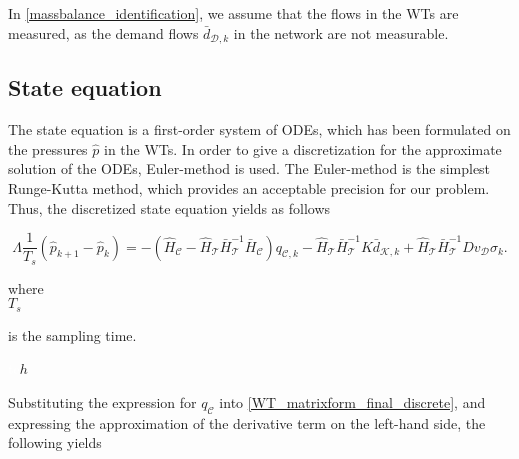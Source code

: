  In \eqref{massbalance_identification}, we assume that the flows in the WTs are measured, as the demand flows $\bar{d}_{\mathcal{D},k} $ in the network are not measurable. 


 \subsection{State equation}
\label{state_eq_identification} 

The state equation is a first-order system of ODEs, which has been formulated on the pressures $\hat{p}$ in the WTs. In order to give a discretization for the approximate solution of the ODEs, Euler-method is used. The Euler-method is the simplest Runge-Kutta method, which provides an acceptable precision for our problem\cite{chicone2006ordinary}. Thus, the discretized state equation yields as follows

\begin{equation}
  \label{WT_matrixform_final_discrete}
\Lambda \frac{1}{T_s} (\hat{p}_{k+1} - \hat{p}_k)  = - (\hat{H}_{\mathcal{C}} - \hat{H}_{\mathcal{T}} \bar{H}^{-1}_{\mathcal{T}}\bar{H}_{\mathcal{C}})  q_{\mathcal{C},k} - \hat{H}_{\mathcal{T}} \bar{H}^{-1}_{\mathcal{T}} K \bar{d}_{\mathcal{K},k} + \hat{H}_{\mathcal{T}} \bar{H}^{-1}_{\mathcal{T}} D v_{\mathcal{D}} \sigma_k.
\end{equation}

\begin{minipage}[t]{0.20\textwidth}
where\\
\hspace*{8mm} $T_s$
\end{minipage}
\begin{minipage}[t]{0.68\textwidth}
\vspace*{2mm}
 is the sampling time.
\end{minipage}
\begin{minipage}[t]{0.10\textwidth}
\vspace*{2mm}
\textcolor{White}{te}$\unit{h}$
\end{minipage} 

Substituting the expression for $q_{\mathcal{C}}$ into \eqref{WT_matrixform_final_discrete}, and expressing the approximation of the derivative term on the left-hand side, the following yields

